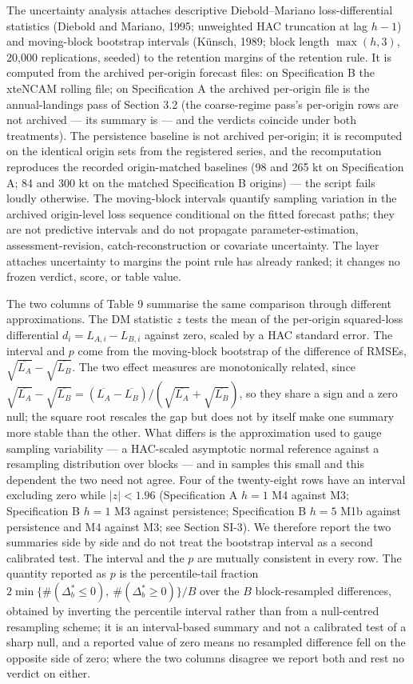 \documentclass[11pt]{article}
\begin{document}
The uncertainty analysis attaches descriptive Diebold--Mariano loss-differential statistics
(Diebold and Mariano, 1995; unweighted HAC truncation at lag \(h-1\)) and
moving-block bootstrap intervals (K\"unsch, 1989; block length
\(\max(h,3)\), 20,000 replications, seeded) to the retention margins of
the retention rule. It is computed from the archived per-origin forecast
files: on Specification B the xteNCAM rolling file; on Specification A
the archived per-origin file is the annual-landings pass of Section 3.2
(the coarse-regime pass's per-origin rows are not archived --- its
summary is --- and the verdicts coincide under both treatments). The
persistence baseline is not archived per-origin; it is recomputed on the
identical origin sets from the registered series, and the recomputation
reproduces the recorded origin-matched baselines (98 and 265 kt on
Specification A; 84 and 300 kt on the matched Specification B origins)
--- the script fails loudly otherwise. The moving-block intervals quantify sampling variation in the archived
origin-level loss sequence conditional on the fitted forecast paths; they
are not predictive intervals and do not propagate parameter-estimation,
assessment-revision, catch-reconstruction or covariate uncertainty. The
layer attaches uncertainty to margins the point rule has already
ranked; it changes no frozen verdict,
score, or table value.

The two columns of Table 9 summarise the same comparison through
different approximations. The DM statistic \(z\) tests the mean of the
per-origin squared-loss differential \(d_i = L_{A,i} - L_{B,i}\) against
zero, scaled by a HAC standard error. The interval and \(p\) come from
the moving-block bootstrap of the difference of RMSEs,
\(\sqrt{\overline{L_A}} - \sqrt{\overline{L_B}}\). The two effect
measures are monotonically related, since
\(\sqrt{\overline{L_A}}-\sqrt{\overline{L_B}} =
(\overline{L_A}-\overline{L_B})/(\sqrt{\overline{L_A}}+
\sqrt{\overline{L_B}})\), so they share a sign and a zero null; the
square root rescales the gap but does not by itself make one summary
more stable than the other. What differs is the approximation used to
gauge sampling variability --- a HAC-scaled asymptotic normal reference
against a resampling distribution over blocks --- and in samples this
small and this dependent the two need not agree. Four of the
twenty-eight rows have an interval excluding zero while \(|z| < 1.96\)
(Specification A \(h=1\) M4 against M3; Specification B \(h=1\) M3
against persistence; Specification B \(h=5\) M1b against persistence and
M4 against M3; see Section SI-3). We therefore report the two
summaries side by side
and do not treat the bootstrap interval as a second calibrated test. The interval and the \(p\) are mutually
consistent in every row. The quantity reported as \(p\) is the percentile-tail fraction
\(2\min\{\#(\Delta^{*}_b\le 0),\ \#(\Delta^{*}_b\ge 0)\}/B\) over the
\(B\) block-resampled differences, obtained by inverting the percentile
interval rather than from a null-centred resampling scheme; it is an
interval-based summary and not a calibrated test of a sharp null, and a
reported value of zero means no resampled difference fell on the
opposite side of zero; where the two columns disagree we
report both and rest no verdict on either.
\end{document}
